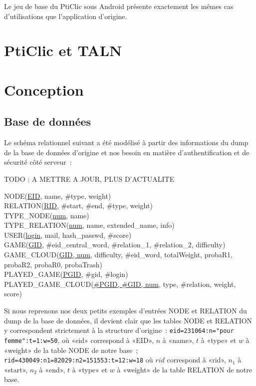 \documentclass[a4paper,11pt,french]{article}
\def\android{Android\texttrademark{}}
\begin{document}
Le jeu de base du PtiClic sous \android{} présente exactement les mêmes cas d'utilisations que l'application d'origine. 


\section{PtiClic et TALN}








\section{Conception}


\subsection{Base de données}

Le schéma relationnel suivant a été modélisé à partir des informations du dump de la base de données d'origine et nos besoin en matière d'authentification et de sécurité côté serveur~:

TODO : A METTRE A JOUR, PLUS D'ACTUALITE

{\footnotesize
NODE(\underline{EID}, name, \#type, weight) \\ 
RELATION(\underline{RID}, \#start, \#end, \#type, weight) \\
TYPE\_NODE(\underline{num}, name) \\
TYPE\_RELATION(\underline{num}, name, extended\_name, info) \\
USER(\underline{login}, mail, hash\_passwd, \#score) \\
GAME(\underline{GID}, \#eid\_central\_word, \#relation\_1, \#relation\_2, difficulty) \\
GAME\_CLOUD(\underline{GID, num}, difficulty, \#eid\_word, totalWeight, probaR1, probaR2, probaR0, probaTrash) \\
PLAYED\_GAME(\underline{PGID}, \#gid, \#login) \\
PLAYED\_GAME\_CLOUD(\underline{\#PGID, \#GID, num}, type, \#relation, weight, score) 
}

Si nous reprenons nos deux petits exemples d'entrées NODE et RELATION du dump de la base de données, il devient clair que les tables NODE et
RELATION y correspondent strictement à la structure d'origine~: \verb!eid=231064:n="pour femme":t=1:w=50!, où «eid» correspond à «EID», $n$ à
«name», $t$ à «type» et $w$ à «weight» de la table NODE de notre base~; \verb!rid=430049:n1=82029:n2=151553:t=12:w=18! où $rid$ correspond à «rid»,
$n_1$ à «start», $n_2$ à «end», $t$ à «type» et $w$ à «weight» de la table RELATION de notre base.
\end{document}
